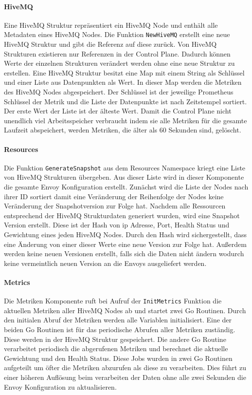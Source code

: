 \paragraph{HiveMQ}
Eine HiveMQ Struktur repräsentiert ein HiveMQ Node und enthält alle Metadaten eines HiveMQ Nodes. Die Funktion \verb|NewHiveMQ| erstellt eine neue HiveMQ Struktur und gibt die Referenz auf diese zurück. Von HiveMQ Strukturen existieren nur Referenzen in der Control Plane. Dadurch können Werte der einzelnen Strukturen verändert werden ohne eine neue Struktur zu erstellen.
Eine HiveMQ Struktur besitzt eine Map mit einem String als Schlüssel und einer Liste aus Datenpunkten als Wert. In dieser Map werden die Metriken des HiveMQ Nodes abgespeichert. Der Schlüssel ist der jeweilige Prometheus Schlüssel der Metrik und die Liste der Datenpunkte ist nach Zeitstempel sortiert. Der erste Wert der Liste ist der älteste Wert. Damit die Control Plane nicht unendlich viel Arbeitsspeicher verbraucht indem sie alle Metriken für die gesamte Laufzeit abspeichert, werden Metriken, die älter als 60 Sekunden sind, gelöscht.

\paragraph{Resources}
Die Funktion \verb|GenerateSnapshot| aus dem Resources Namespace kriegt eine Liste von HiveMQ Strukturen übergeben. Aus dieser Liste wird in dieser Komponente die gesamte Envoy Konfiguration erstellt. Zunächst wird die Liste der Nodes nach ihrer ID sortiert damit eine Veränderung der Reihenfolge der Nodes keine Veränderung der Snapshotversion zur Folge hat. Nachdem alle Ressourcen entsprechend der HiveMQ Strukturdaten generiert wurden, wird eine Snapshot Version erstellt. Diese ist der Hash von \ac{ip} Adresse, Port, Health Status und Gewichtung eines jeden HiveMQ Nodes. Durch den Hash wird sichergestellt, dass eine Änderung von einer dieser Werte eine neue Version zur Folge hat. Au{\ss}erdem werden keine neuen Versionen erstellt, falls sich die Daten nicht ändern wodurch keine vermeintlich neuen Version an die Envoys ausgeliefert werden.

\paragraph{Metrics}
Die Metriken Komponente ruft bei Aufruf der \verb|InitMetrics| Funktion die aktuellen Metriken aller HiveMQ Nodes ab und startet zwei Go Routinen. Durch den initialen Abruf der Metriken werden alle Variablen initialisiert. Eine der beiden Go Routinen ist für das periodische Abrufen aller Metriken zuständig. Diese werden in der HiveMQ Struktur gespeichert. Die andere Go Routine verarbeitet periodisch die abgerufenen Metriken und berechnet die aktuelle Gewichtung und den Health Status. Diese Jobs wurden in zwei Go Routinen aufgeteilt um öfter die Metriken abzurufen als diese zu verarbeiten. Dies führt zu einer höheren Auflösung beim verarbeiten der Daten ohne alle zwei Sekunden die Envoy Konfiguration zu aktualisieren.

